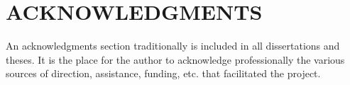 \documentclass[12pt]{report} %
\numberwithin{equation}{subsection}
\numberwithin{figure}{chapter} %
\theoremstyle{numbernote}
\theoremstyle{nonumber}
\theoremstyle{nonumbernonote}
\theoremstyle{nonote}
\begin{document}
\pagebreak

\listoftables
{} %


\pagebreak

\chapter*{ACKNOWLEDGMENTS} %

An acknowledgments section traditionally is included in all dissertations and theses. It
is the place for the author to acknowledge professionally the various sources of
direction, assistance, funding, etc. that facilitated the project. 



\end{document}
